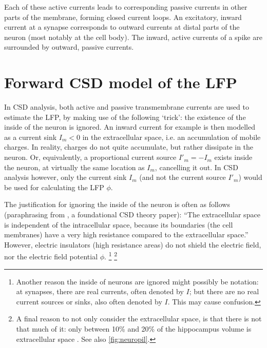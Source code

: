 
Each of these active currents leads to corresponding passive currents in other parts of the membrane, forming closed current loops. An excitatory, inward current at a synapse corresponds to outward currents at distal parts of the neuron (most notably at the cell body). The inward, active currents of a spike are surrounded by outward, passive currents.



\section{Forward CSD model of the LFP}
\label{sec:forward-CSD}

In CSD analysis, both active and passive transmembrane currents are used to estimate the LFP, by making use of the following `trick': the existence of the inside of the neuron is ignored. An inward current for example is then modelled as a current sink $I_m < 0$ in the extracellular space, i.e. an accumulation of mobile charges. In reality, charges do not quite accumulate, but rather dissipate in the neuron. Or, equivalently, a proportional current source $I'_m = -I_m$ exists inside the neuron, at virtually the same location as $I_m$, cancelling it out. In CSD analysis however, only the current sink $I_m$ (and not the current source $I'_m$) would be used for calculating the LFP $\phi$.

The justification for ignoring the inside of the neuron is often as follows (paraphrasing from \cite{Mitzdorf1985}, a foundational CSD theory paper): ``The extracellular space is independent of the intracellular space, because its boundaries (the cell membranes) have a very high resistance compared to the extracellular space.'' However, electric insulators (high resistance areas) do not shield the electric field, nor the electric field potential $\phi$.
%
\footnote{Another reason the inside of neurons are ignored might possibly be notation: at synapses, there are real currents, often denoted by $I$; but there are no real current sources or sinks, also often denoted by $I$. This may cause confusion.}
\footnote{A final reason to not only consider the extracellular space, is that there is not that much of it: only between 10\% and 20\% of the hippocampus volume is extracellular space \cite{Sykova1997a}. See also \cref{fig:neuropil}.}

